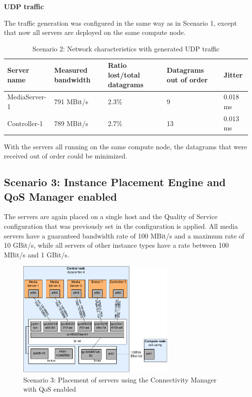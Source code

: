 \textbf{UDP traffic}

The traffic generation was configured in the same way as in Scenario 1, except that now all servers are deployed on the same compute node.

\begin{table}[H]
\centering

\begin{tabularx}{\textwidth}{ |X|X|X|X|X| }
\hline Server name & Measured bandwidth & Ratio lost/total datagrams & Datagrams out of order & Jitter \\ 
\hline MediaServer-1 & 791 MBit/s & 2.3\% & 9 & 0.018 ms\\ 
\hline Controller-1 & 789 MBit/s & 2.7\% & 13 & 0.013 ms \\ 
\hline 
\end{tabularx}

\caption{Scenario 2: Network characteristics with generated UDP traffic}
\end{table}

With the servers all running on the same compute node, the datagrams that were received out of order could be minimized.

\subsection{Scenario 3: Instance Placement Engine and QoS Manager enabled}

The servers are again placed on a single host and the Quality of Service configuration that was previously set in the configuration is applied. All media servers have a guaranteed bandwidth rate of 100 MBit/s and a maximum rate of 10 GBit/s, while all servers of other instance types have a rate between 100 MBit/s and 1 GBit/s.

\begin{figure}[H]
\centering

\includegraphics[width=0.7\textwidth]{images/evaluation/testbed_scenario3}

\caption{Scenario 3: Placement of servers using the Connectivity Manager with QoS enabled}
\end{figure}

